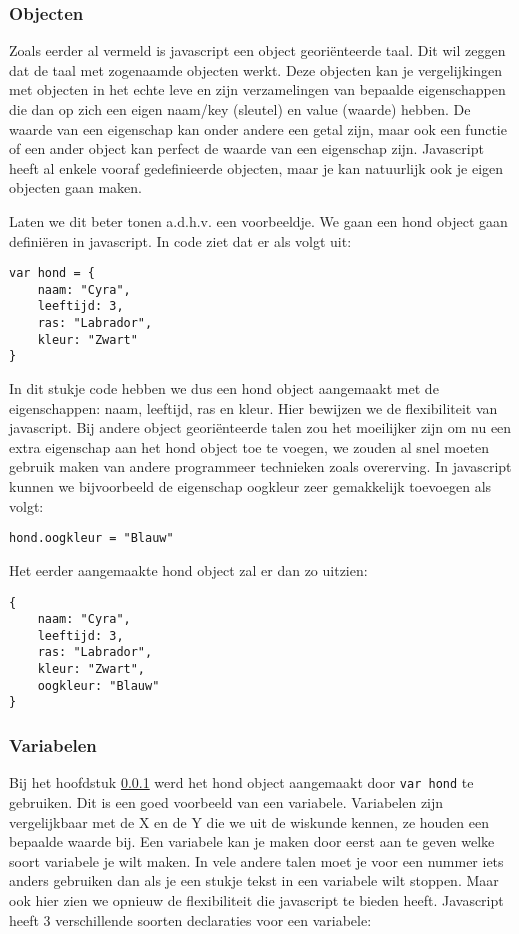 \subsubsection{Objecten}
\label{sssec:objecten}
Zoals eerder al vermeld is javascript een object georiënteerde taal. Dit wil zeggen dat de taal met zogenaamde objecten werkt. Deze objecten kan je vergelijkingen met objecten in het echte leve en zijn verzamelingen van bepaalde eigenschappen die dan op zich een eigen naam/key (sleutel) en value (waarde) hebben. De waarde van een eigenschap kan onder andere een getal zijn, maar ook een functie of een ander object kan perfect de waarde van een eigenschap zijn. Javascript heeft al enkele vooraf gedefinieerde objecten, maar je kan natuurlijk ook je eigen objecten gaan maken.

Laten we dit beter tonen a.d.h.v. een voorbeeldje. We gaan een hond object gaan definiëren in javascript. In code ziet dat er als volgt uit:

\begin{lstlisting}[frame=single, caption=Hond object aanmaken]
var hond = {
	naam: "Cyra",
	leeftijd: 3,
	ras: "Labrador",
	kleur: "Zwart"
}
\end{lstlisting}

In dit stukje code hebben we dus een hond object aangemaakt met de eigenschappen: naam, leeftijd, ras en kleur. Hier bewijzen we de flexibiliteit van javascript. Bij andere object georiënteerde talen zou het moeilijker zijn om nu een extra eigenschap aan het hond object toe te voegen, we zouden al snel moeten gebruik maken van andere programmeer technieken zoals overerving. In javascript kunnen we bijvoorbeeld de eigenschap oogkleur zeer gemakkelijk toevoegen als volgt:

\begin{lstlisting}[frame=single, caption=Eigenschap toevoegen aan en object]
hond.oogkleur = "Blauw"
\end{lstlisting}

Het eerder aangemaakte hond object zal er dan zo uitzien:

\begin{lstlisting}[frame=single, caption=Het nieuwe hond object]
{
	naam: "Cyra",
 	leeftijd: 3,
 	ras: "Labrador",
 	kleur: "Zwart",
 	oogkleur: "Blauw"
}
\end{lstlisting}

\subsubsection{Variabelen}
\label{sssec:variabelen}
Bij het hoofdstuk \ref{sssec:objecten} werd het hond object aangemaakt door \lstinline[basicstyle=\ttfamily\color{red}]|var hond| te gebruiken. Dit is een goed voorbeeld van een variabele. Variabelen zijn vergelijkbaar met de X en de Y die we uit de wiskunde kennen, ze houden een bepaalde waarde bij. Een variabele kan je maken door eerst aan te geven welke soort variabele je wilt maken. In vele andere talen moet je voor een nummer iets anders gebruiken dan als je een stukje tekst in een variabele wilt stoppen. Maar ook hier zien we opnieuw de flexibiliteit die javascript te bieden heeft. Javascript heeft 3 verschillende soorten declaraties voor een variabele:

